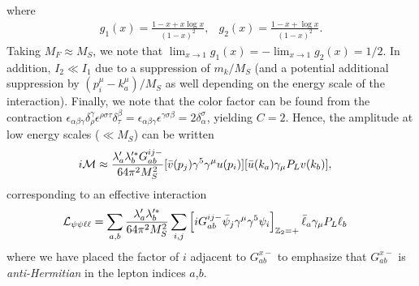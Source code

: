 where
\begin{align}
    & g_1(x) = \frac{1-x+x\log{x}}{(1-x)^2},
     & g_2(x) = \frac{1-x+\log{x}}{(1-x)^2}. &
\end{align}
Taking $M_F \approx M_S$, we note that $\lim_{x\rightarrow 1}g_1(x) = -\lim_{x\rightarrow 1}g_2(x) = 1/2$. In addition, $I_2 \ll I_1$ due to a suppression of $m_k/M_S$ (and a potential additional suppression by $(p_i^\mu - k_a^\mu)/M_S$ as well depending on the energy scale of the interaction). Finally, we note that the color factor can be found from the contraction $\epsilon_{\alpha\beta\gamma}\delta_{\rho}^{\gamma}\epsilon^{\rho\sigma\tau}\delta_{\tau}^{\beta}=\epsilon_{\alpha\beta\gamma}\epsilon^{\gamma\sigma\beta} = 2\delta_\alpha^\sigma$, yielding $C = 2$. Hence, the amplitude at low energy scales ($\ll M_S$) can be written
\begin{align}
    i{\cal M} &\approx \frac{\lambda_a'\lambda_b'^* G_{ab}^{ij-}}{64\pi^2 M_S^2}[\bar{v}(p_j)\gamma^5 \gamma^\mu u(p_i)][ \bar{u}(k_a) \gamma_\mu P_L v(k_b)],
\end{align}
corresponding to an effective interaction 
\begin{align}
    {\cal L}_{\psi\psi\ell\ell} &= \sum_{a,b}\frac{\lambda_a'\lambda_b'^*}{64\pi^2 M_S^2} \sum_{i,j}\left[iG_{ab}^{ij-}\bar{\psi}_j \gamma^\mu \gamma^5 \psi_i\right]_{{\Bbb Z}_2 = +} \bar{\ell}_a \gamma_\mu P_L \ell_b\label{eq:dark_quark_eff_int}
\end{align}
where we have placed the factor of $i$ adjacent to $G_{ab}^{x-}$ to emphasize that $G_{ab}^{x-}$ is {\it anti-Hermitian} in the lepton indices $a$,$b$.
